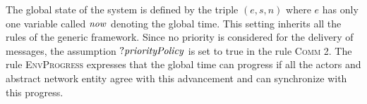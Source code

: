 The global state of the system is defined by the triple $(e,s,n)$ where $e$ has only one variable called $\mathit{now}$ denoting the global time. This setting inherits all the rules of the generic framework. Since no priority is considered for the delivery of messages, the assumption $?{\it priorityPolicy}$ is set to true in the rule \textsc{Comm 2}. The rule \textsc{EnvProgress} expresses that the global time can progress if all the actors and abstract network entity agree with this advancement and can synchronize with this progress. %






